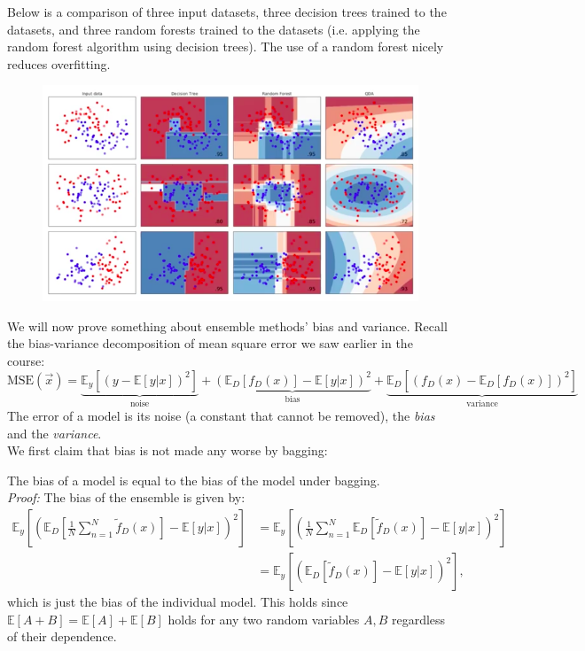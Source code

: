 \newpage
Below is a comparison of three input datasets, three decision trees trained to the datasets, and three random forests trained to the datasets (i.e. applying the random forest algorithm using decision trees). The use of a random forest nicely reduces overfitting. 

\begin{figure}[H]
\centering
\includegraphics[scale=0.5]{randomforest.png}
\end{figure}

\minirule

We will now prove something about ensemble methods' bias and variance. Recall the bias-variance decomposition of mean square error we saw earlier in the course:
\begin{equation*}
\text{MSE}(\vec{x}) = \underbrace{\mathbb{E}_y[(y - \mathbb{E}[y|x])^2]}_{\text{noise}} + \underbrace{\left( \mathbb{E}_D[f_D(x)] - \mathbb{E}[y|x] \right)^2}_{\text{bias}} + \underbrace{\mathbb{E}_D\left[ (f_D(x) - \mathbb{E}_D[f_D(x)])^2 \right]}_{\text{variance}}
\end{equation*}
The error of a model is its noise (a constant that cannot be removed), the \textit{bias} and the \textit{variance}.\\

We first claim that bias is not made any worse by bagging:
\begin{frameprop}
The bias of a model is equal to the bias of the model under bagging.\\

\textit{Proof:} The bias of the ensemble is given by:
\begin{align*}
\mathbb{E}_y \left[ \left( \mathbb{E}_D\left[ \frac{1}{N} \sum_{n=1}^{N} \tilde{f}_D(x) \right] - \mathbb{E}[y|x] \right)^2 \right] &= \mathbb{E}_y \left[ \left( \frac{1}{N} \sum_{n=1}^{N} \mathbb{E}_D[\tilde{f}_D(x)] - \mathbb{E}[y|x] \right)^2 \right]\\[1.5ex]
&= \mathbb{E}_y \left[ \left( \mathbb{E}_D[\tilde{f}_D(x)] - \mathbb{E}[y|x] \right)^2 \right],
\end{align*}
which is just the bias of the individual model. This holds since $\mathbb{E}[A+B] = \mathbb{E}[A] + \mathbb{E}[B]$ holds for any two random variables $A, B$ regardless of their dependence. \qedsymbol
\end{frameprop}



